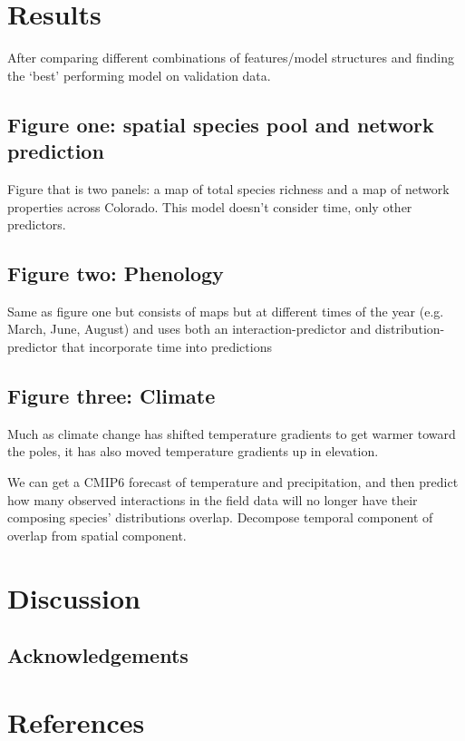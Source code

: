 \documentclass[10pt,oneside]{article}
\begin{document}
\hypertarget{results}{%
\section{Results}\label{results}}

After comparing different combinations of features/model structures and
finding the `best' performing model on validation data.

\hypertarget{figure-one-spatial-species-pool-and-network-prediction}{%
\subsection{Figure one: spatial species pool and network
prediction}\label{figure-one-spatial-species-pool-and-network-prediction}}

Figure that is two panels: a map of total species richness and a map of
network properties across Colorado. This model doesn't consider time,
only other predictors.

\hypertarget{figure-two-phenology}{%
\subsection{Figure two: Phenology}\label{figure-two-phenology}}

Same as figure one but consists of maps but at different times of the
year (e.g. March, June, August) and uses both an interaction-predictor
and distribution-predictor that incorporate time into predictions

\hypertarget{figure-three-climate}{%
\subsection{Figure three: Climate}\label{figure-three-climate}}

Much as climate change has shifted temperature gradients to get warmer
toward the poles, it has also moved temperature gradients up in
elevation.

We can get a CMIP6 forecast of temperature and precipitation, and then
predict how many observed interactions in the field data will no longer
have their composing species' distributions overlap. Decompose temporal
component of overlap from spatial component.

\hypertarget{discussion}{%
\section{Discussion}\label{discussion}}

\hypertarget{acknowledgements}{%
\subsection{Acknowledgements}\label{acknowledgements}}

\hypertarget{references}{%
\section{References}\label{references}}
\end{document}
